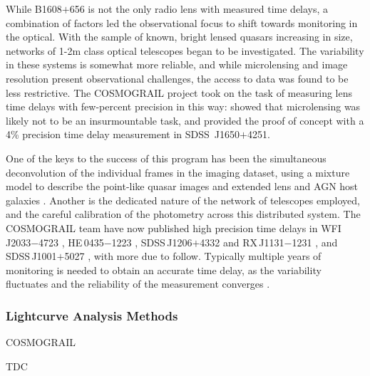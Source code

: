 While B1608$+$656 is not the only radio lens with measured time delays,
a combination of factors  led the observational focus to shift towards
monitoring in the optical. With the sample of known, bright lensed
quasars increasing in size,  networks of 1-2m class optical telescopes
began to be investigated. The variability in these systems is somewhat
more reliable, and while microlensing  and image resolution present
observational challenges, the access to data was found to be less
restrictive. The COSMOGRAIL project took on the task of measuring lens
time delays with few-percent precision in this way:  \citet{Eig++05}
showed that microlensing was likely not to be an insurmountable task,
and \citet{Vui++05} provided the proof of  concept with a 4\% precision
time delay measurement in SDSS\ J1650$+$4251.

One of the keys to the success of this program has been the simultaneous
deconvolution of the individual frames in the imaging dataset, using  a
mixture model to describe the point-like quasar images and extended lens
and AGN host galaxies \citep{MCS98}.  Another is the dedicated nature of
the network of telescopes employed, and the  careful calibration of the
photometry across this distributed system. The COSMOGRAIL team have now
published high precision time delays in WFI\,J2033$-$4723
\citep[][3.8\%]{Vui++08}, HE\,0435$-$1223 \citep[][5.6\%]{Cou++11},
SDSS\,J1206$+$4332 \citep[][2.7\%]{Eul++13} and  RX\,J1131$-$1231
\citep[][1.5\%]{Tew++13}, and SDSS\,J1001$+$5027
\citep[][2.8\%]{RK++13}, with more due to follow.  Typically multiple
years of monitoring is needed to obtain an accurate  time delay, as the
variability fluctuates and the reliability of the  measurement converges
\citep[see the discussion in e.g.\ ][]{Tew++13}.



\subsubsection{Lightcurve Analysis Methods}



COSMOGRAIL

TDC

